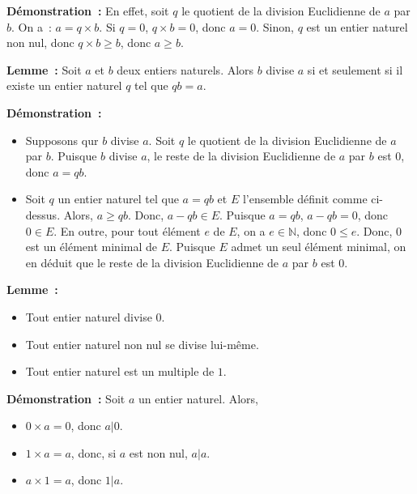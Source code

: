 \noindent\textbf{Démonstration :} 
    En effet, soit $q$ le quotient de la division Euclidienne de $a$ par $b$. 
    On a : $a = q \times b$.
    Si $q = 0$, $q \times b = 0$, donc $a = 0$.
    Sinon, $q$ est un entier naturel non nul, donc $q \times b \geq b$, donc $a \geq b$.

    \done

\medskip

\noindent\textbf{Lemme :} Soit $a$ et $b$ deux entiers naturels. 
    Alors $b$ divise $a$ si et seulement si il existe un entier naturel $q$ tel que $q b = a$.

\medskip

\noindent\textbf{Démonstration :} 
    \begin{itemize}[nosep]
        \item Supposons qur $b$ divise $a$. 
            Soit $q$ le quotient de la division Euclidienne de $a$ par $b$. 
            Puisque $b$ divise $a$, le reste de la division Euclidienne de $a$ par $b$ est $0$, donc $a = q b$.
        \item Soit $q$ un entier naturel tel que $a = q b$ et $E$ l'ensemble définit comme ci-dessus.
            Alors, $a \geq q b$.
            Donc, $a - q b \in E$.
            Puisque $a = q b$, $a - q b = 0$, donc $0 \in E$. 
            En outre, pour tout élément $e$ de $E$, on a $e \in \mathbb{N}$, donc $0 \leq e$.
            Donc, $0$ est un élément minimal de $E$. 
            Puisque $E$ admet un seul élément minimal, on en déduit que le reste de la division Euclidienne de $a$ par $b$ est $0$.
    \end{itemize}

    \done

\medskip

\noindent\textbf{Lemme :} 
\begin{itemize}[nosep]
    \item Tout entier naturel divise $0$.
    \item Tout entier naturel non nul se divise lui-même. 
    \item Tout entier naturel est un multiple de $1$.
\end{itemize}

\medskip

\noindent\textbf{Démonstration :}
Soit $a$ un entier naturel. 
Alors, 
\begin{itemize}[nosep]
    \item $0 \times a = 0$, donc $a \vert 0$.
    \item $1 \times a = a$, donc, si $a$ est non nul, $a \vert a$. 
    \item $a \times 1 = a$, donc $1 \vert a$.
\end{itemize}

